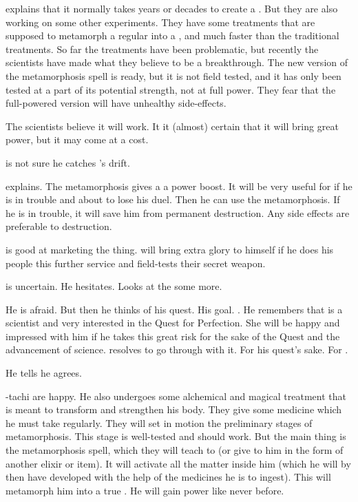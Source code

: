\Azraid explains that it normally takes years or decades to create a \neoresphan.
But they are also working on some other experiments.
They have some treatments that are supposed to metamorph a regular \resphan into a \neoresphan, and much faster than the traditional treatments. 
So far the treatments have been problematic, but recently the scientists have made what they believe to be a breakthrough.
The new version of the metamorphosis spell is ready, but it is not field tested, and it has only been tested at a part of its potential strength, not at full power. 
They fear that the full-powered version will have unhealthy side-effects. 

The scientists believe it will work. 
It it (almost) certain that it will bring great power, but it may come at a cost. 

\Teshrial is not sure he catches \Azraid's drift. 

\Azraid explains.
The metamorphosis gives a \resphan a power boost. 
It will be very useful for \Teshrial if he is in trouble and about to lose his duel.
Then he can use the metamorphosis. 
If he is in trouble, it will save him from permanent destruction. 
Any side effects are preferable to destruction. 

\Azraid{} is good at marketing the thing. 
\Teshrial{} will bring extra glory to himself if he does his people this further service and field-tests their secret weapon. 



\begin{comment}
  \subsection{Teshrial considers and agrees}
\end{comment}

\Teshrial is uncertain.
He hesitates.
Looks at the \neoresphain some more.

He is afraid. 
But then he thinks of his quest.
His goal.
\Firaxel.
He remembers that \Firaxel is a scientist and very interested in the Quest for Perfection.
She will be happy and impressed with him if he takes this great risk for the sake of the Quest and the advancement of science.
\Teshrial resolves to go through with it. 
For his quest's sake. 
For \Firaxel. 

He tells \Azraid he agrees. 

\Azraid-tachi are happy.
He also undergoes some alchemical and magical treatment that is meant to transform and strengthen his body. 
They give \Teshrial some medicine which he must take regularly.
They will set in motion the preliminary stages of metamorphosis.
This stage is well-tested and should work. 
But the main thing is the metamorphosis spell, which they will teach to \Teshrial (or give to him in the form of another elixir or item). 
It will activate all the \neoresphan matter inside him (which he will by then have developed with the help of the medicines he is to ingest). 
This will metamorph him into a true \neoresphan. 
He will gain power like never before. 

